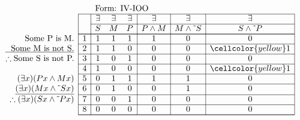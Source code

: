 \documentclass[10pt,legalpaper,landscape,cmtt]{article}
\begin{document}
{\begin{minipage}[t]{3.25in}
	\(
	\begin{array}{r|c|ccc|c|c|c|}
		\multicolumn{2}{c}{}&\multicolumn{6}{l}{\mbox{Form: IV-IOO}} \\ \cline{2-8}
		\hspace{1in}	&	& \exists & \exists & \exists & \exists & \exists & \exists\\ \cline{3-8}
		&	& S & M & P &  P \wedge M  &  M \wedge \tilde~S  &  S \wedge \tilde~P \\ \cline{2-8} \cline{2-8}
		\phantom{\therefore}\mbox{Some P is M.}   & 1 & 1 & 1 & 1 &   1   &   0   &   0  \\ \cline{2-8}
		\underline{\phantom{\therefore}\mbox{Some M is not S.}}   & 2 & 1 & 1 & 0 &   0   &   0   &   \cellcolor{yellow} 1  \\ \cline{2-8}
		\therefore \mbox{Some S is not P.}   & 3 & 1 & 0 & 1 &   0   &   0   &   0  \\ \cline{2-8}
		& 4 & 1 & 0 & 0 &   0   &   0   &   \cellcolor{yellow} 1  \\ \cline{2-8}
		(\exists x)(Px \wedge Mx)   & 5 & 0 & 1 & 1 &   1   &   1   &   0  \\ \cline{2-8}
		\underline{(\exists x)(Mx \wedge \tilde~Sx)}   & 6 & 0 & 1 & 0 &   0   &   1   &   0  \\ \cline{2-8}
		\therefore(\exists x)(Sx \wedge \tilde~Px)   & 7 & 0 & 0 & 1 &   0   &   0   &   0  \\ \cline{2-8}
		& 8 & 0 & 0 & 0 &   0   &   0   &   0   \\ \cline{2-8}\cline{2-8} 
	\end{array}
	\)
\end{minipage}

\newpage %

}
\end{document}
